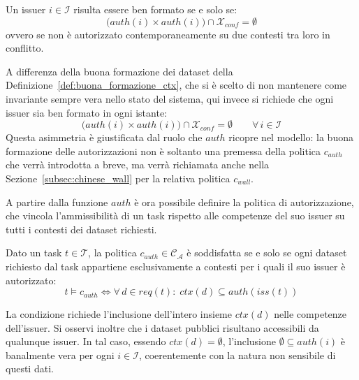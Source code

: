 \begin{definition}
    \label{def:buona_formazione_auth}
    Un issuer $i \in \mathcal{I}$ risulta essere ben formato se e solo se:
    \begin{equation}
        \bigl( auth(i) \times auth(i) \bigr) \cap \mathcal{X}_{conf} = \emptyset
    \end{equation}
    ovvero se non è autorizzato contemporaneamente su due contesti tra loro in conflitto.
\end{definition}

A differenza della buona formazione dei dataset della Definizione~\ref{def:buona_formazione_ctx}, che si è scelto di non mantenere come invariante sempre vera nello stato del sistema, qui invece si richiede che ogni issuer sia ben formato in ogni istante:
\begin{equation}
    \bigl( auth(i) \times auth(i) \bigr) \cap \mathcal{X}_{conf} = \emptyset
    \qquad
    \forall\, i \in \mathcal{I}
\end{equation}
Questa asimmetria è giustificata dal ruolo che $auth$ ricopre nel modello: la buona formazione delle autorizzazioni non è soltanto una premessa della politica $c_{auth}$ che verrà introdotta a breve, ma verrà richiamata anche nella Sezione~\ref{subsec:chinese_wall} per la relativa politica $c_{wall}$. 

A partire dalla funzione $auth$ è ora possibile definire la politica di autorizzazione, che vincola l'ammissibilità di un task rispetto alle competenze del suo issuer su tutti i contesti dei dataset richiesti.

\begin{policy}
    \label{pol:c_auth}
    Dato un task $t \in \mathcal{T}$, la politica $c_{auth} \in \mathcal{C_A}$ è soddisfatta se e solo se ogni dataset richiesto dal task appartiene esclusivamente a contesti per i quali il suo issuer è autorizzato:
    \begin{equation}
        t \models c_{auth}
        \iff
        \forall\, d \in req(t) :\; ctx(d) \subseteq auth(iss(t))
    \end{equation}
\end{policy}

La condizione richiede l'inclusione dell'intero insieme $ctx(d)$ nelle competenze dell'issuer. Si osservi inoltre che i dataset pubblici risultano accessibili da qualunque issuer. In tal caso, essendo $ctx(d) = \emptyset$, l'inclusione $\emptyset \subseteq auth(i)$ è banalmente vera per ogni $i \in \mathcal{I}$, coerentemente con la natura non sensibile di questi dati.

